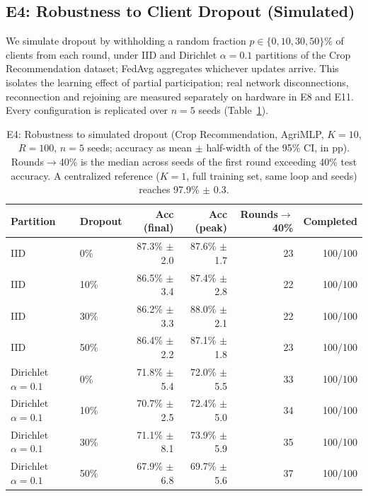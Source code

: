 \subsection{E4: Robustness to Client Dropout (Simulated)}
\label{sec:e4}

We simulate dropout by withholding a random fraction $p \in \{0, 10, 30, 50\}$\% of clients from each round, under IID and Dirichlet $\alpha{=}0.1$ partitions of the Crop Recommendation dataset; FedAvg aggregates whichever updates arrive. This isolates the learning effect of partial participation; real network disconnections, reconnection and rejoining are measured separately on hardware in E8 and E11. Every configuration is replicated over $n{=}5$ seeds (Table~\ref{tab:e4}).

\begin{table}[t]
\centering
\caption{E4: Robustness to simulated dropout (Crop Recommendation, AgriMLP, $K{=}10$, $R{=}100$, $n{=}5$ seeds; accuracy as mean $\pm$ half-width of the 95\% CI, in pp). Rounds$\to$40\% is the median across seeds of the first round exceeding 40\% test accuracy. A centralized reference ($K{=}1$, full training set, same loop and seeds) reaches 97.9\% $\pm$ 0.3.}
\label{tab:e4}
\footnotesize
\begin{tabular}{l l r r r r}
\toprule
\textbf{Partition} & \textbf{Dropout} & \textbf{Acc (final)} & \textbf{Acc (peak)} & \textbf{Rounds$\to$40\%} & \textbf{Completed} \\
\midrule
IID & 0\%  & 87.3\% $\pm$ 2.0 & 87.6\% $\pm$ 1.7 & 23 & 100/100 \\
IID & 10\% & 86.5\% $\pm$ 3.4 & 87.4\% $\pm$ 2.8 & 22 & 100/100 \\
IID & 30\% & 86.2\% $\pm$ 3.3 & 88.0\% $\pm$ 2.1 & 22 & 100/100 \\
IID & 50\% & 86.4\% $\pm$ 2.2 & 87.1\% $\pm$ 1.8 & 23 & 100/100 \\
\midrule
Dirichlet $\alpha{=}0.1$ & 0\%  & 71.8\% $\pm$ 5.4 & 72.0\% $\pm$ 5.5 & 33 & 100/100 \\
Dirichlet $\alpha{=}0.1$ & 10\% & 70.7\% $\pm$ 2.5 & 72.4\% $\pm$ 5.0 & 34 & 100/100 \\
Dirichlet $\alpha{=}0.1$ & 30\% & 71.1\% $\pm$ 8.1 & 73.9\% $\pm$ 5.9 & 35 & 100/100 \\
Dirichlet $\alpha{=}0.1$ & 50\% & 67.9\% $\pm$ 6.8 & 69.7\% $\pm$ 5.6 & 37 & 100/100 \\
\bottomrule
\end{tabular}
\end{table}

